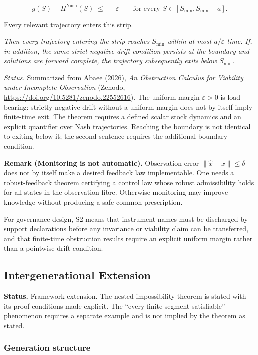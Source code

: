\[g(S) - H^{\mathrm{Nash}}(S) \;\le\; -\varepsilon \qquad \text{for every } S \in [S_{\min}, S_{\min} + a].\]

\item[(H3)] Every relevant trajectory enters this strip.

\emph{Then every trajectory entering the strip reaches $S_{\min}$ within at most $a/\varepsilon$ time. If, in addition, the same strict negative-drift condition persists at the boundary and solutions are forward complete, the trajectory subsequently exits below $S_{\min}$.}

\emph{Status.} Summarized from Abaee (2026), \emph{An Obstruction Calculus for Viability under Incomplete Observation} (Zenodo, \url{https://doi.org/10.5281/zenodo.22552616}). The uniform margin $\varepsilon > 0$ is load-bearing: strictly negative drift without a uniform margin does not by itself imply finite-time exit. The theorem requires a defined scalar stock dynamics and an explicit quantifier over Nash trajectories. Reaching the boundary is not identical to exiting below it; the second sentence requires the additional boundary condition.

\textbf{Remark (Monitoring is not automatic).} Observation error $\|\hat x - x\| \le \delta$ does not by itself make a desired feedback law implementable. One needs a robust-feedback theorem certifying a control law whose robust admissibility holds for all states in the observation fibre. Otherwise monitoring may improve knowledge without producing a safe common prescription.

For governance design, S2 means that instrument names must be discharged by support declarations before any invariance or viability claim can be transferred, and that finite-time obstruction results require an explicit uniform margin rather than a pointwise drift condition.



\subsection{Intergenerational Extension}

\textbf{Status.} Framework extension. The nested-impossibility theorem is stated with its proof conditions made explicit. The ``every finite segment satisfiable'' phenomenon requires a separate example and is not implied by the theorem as stated.


\subsubsection{Generation structure}

